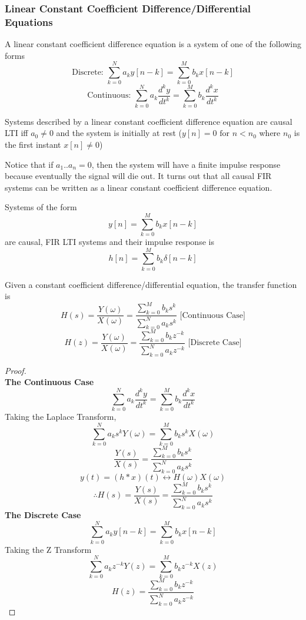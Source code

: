 \subsubsection{Linear Constant Coefficient Difference/Differential Equations}
\begin{definition}
    A linear constant coefficient difference equation is a system of one of the following forms
    \[
\text{Discrete: } \sum_{k=0}^{N}{a_k y[n-k]} = \sum_{k=0}^{M}{b_k x[n-k]}
\]
    \[
\text{Continuous: } \sum_{k=0}^{N}{a_k\frac{d^ky}{dt^k}} = \sum_{k=0}^{M}{b_k\frac{d^kx}{dt^k}}
\]
\end{definition}
\begin{theorem}
    Systems described by a linear constant coefficient difference equation are causal LTI iff $a_0 \ne 0$
    and the system is initially at rest ($y[n] = 0 \text{ for } n < n_0$ where $n_0$ is the first instant $x[n] \ne 0$)
\end{theorem}
Notice that if $a_1..a_n = 0$, then the system will have a finite impulse response because eventually the signal will die out.
It turns out that all causal FIR systems can be written as a linear constant coefficient difference equation.
\begin{theorem}
    Systems of the form
    \[
y[n] = \sum_{k=0}^{M}{b_k x[n-k]}
\] are causal, FIR LTI systems and their impulse response is
    \[
h[n] = \sum_{k=0}^{M}{b_k \delta[n-k]}
\]
\end{theorem}
\begin{theorem}
    Given a constant coefficient difference/differential equation, the transfer function is
    \[
H(s) = \frac{Y(\omega)}{X(\omega)} = \frac{\sum_{k=0}^{M}{b_ks^k}}{\sum_{k=0}^{N}{a_ks^k}}\text{ [Continuous Case]}
\]
    \[
H(z) = \frac{Y(\omega)}{X(\omega)} = \frac{\sum_{k=0}^{M}{b_kz^{-k}}}{\sum_{k=0}^{N}{a_kz^{-k}}}\text{ [Discrete Case]}
\]
\end{theorem}
\begin{proof}
    \textbf{\\The Continuous Case}
    \[
\sum_{k=0}^{N}{a_k\frac{d^ky}{dt^k}} = \sum_{k=0}^{M}{b_k\frac{d^kx}{dt^k}}
\]
    Taking the Laplace Transform,
    \[
\sum_{k=0}^{N}{a_ks^k Y(\omega)} = \sum_{k=0}^{M}{b_ks^k X(\omega)}
\]
    \[
\frac{Y(s)}{X(s)} = \frac{\sum_{k=0}^{M}{b_ks^k}}{\sum_{k=0}^{N}{a_ks^k}}
\]
    \[
y(t) = (h*x)(t) \leftrightarrow H(\omega)X(\omega)
\]
    \[
\therefore H(s) = \frac{Y(s)}{X(s)} = \frac{\sum_{k=0}^{M}{b_ks^k}}{\sum_{k=0}^{N}{a_ks^k}}
\]
    \textbf{The Discrete Case}
    \[
\sum_{k=0}^{N}{a_k y[n-k]} = \sum_{k=0}^{M}{b_k x[n-k]}
\]
    Taking the Z Transform
    \[
\sum_{k=0}^{N}{a_k z^{-k}Y(z)} = \sum_{k=0}^{M}{b_k z^{-k}X(z)}
\]
    \[
H(z) = \frac{\sum_{k=0}^{M}{b_k z^{-k}}}{\sum_{k=0}^{N}{a_k z^{-k}}}
\]
\end{proof}
